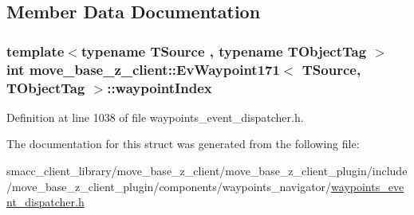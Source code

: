 \subsection{Member Data Documentation}
\subsubsection[{\texorpdfstring{waypoint\+Index}{waypointIndex}}]{\setlength{\rightskip}{0pt plus 5cm}template$<$typename T\+Source , typename T\+Object\+Tag $>$ int {\bf move\+\_\+base\+\_\+z\+\_\+client\+::\+Ev\+Waypoint171}$<$ T\+Source, T\+Object\+Tag $>$\+::waypoint\+Index}\hypertarget{structmove__base__z__client_1_1EvWaypoint171_ad4f260dc2fe757caff5801c954181f12}{}\label{structmove__base__z__client_1_1EvWaypoint171_ad4f260dc2fe757caff5801c954181f12}


Definition at line 1038 of file waypoints\+\_\+event\+\_\+dispatcher.\+h.



The documentation for this struct was generated from the following file\+:\begin{DoxyCompactItemize}
\item 
smacc\+\_\+client\+\_\+library/move\+\_\+base\+\_\+z\+\_\+client/move\+\_\+base\+\_\+z\+\_\+client\+\_\+plugin/include/move\+\_\+base\+\_\+z\+\_\+client\+\_\+plugin/components/waypoints\+\_\+navigator/\hyperlink{waypoints__event__dispatcher_8h}{waypoints\+\_\+event\+\_\+dispatcher.\+h}\end{DoxyCompactItemize}
